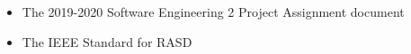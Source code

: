 \begin{itemize}
	\item The 2019-2020 Software Engineering 2 Project Assignment document
	\item The IEEE Standard for RASD 
\end{itemize}